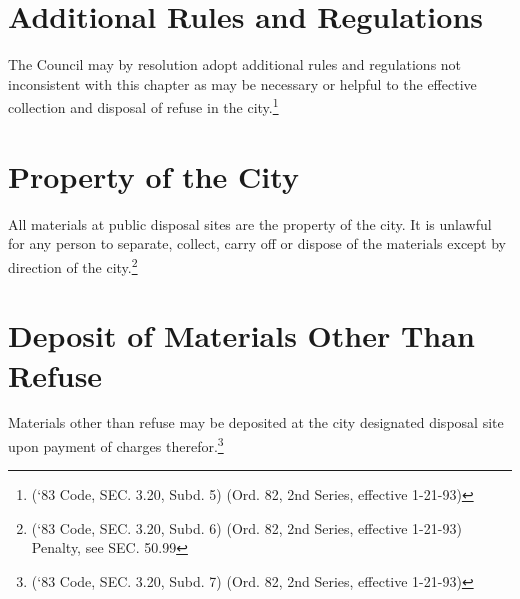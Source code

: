 \section{Additional Rules and Regulations}
The Council may by resolution adopt additional rules and regulations not inconsistent with this chapter as may be necessary or helpful to the effective collection and disposal of refuse in the city.\footnote{(‘83 Code, SEC. 3.20, Subd. 5) (Ord. 82, 2nd Series, effective 1-21-93)}
\section{Property of the City}
All materials at public disposal sites are the property of the city.  It is unlawful for any person to separate, collect, carry off or dispose of the materials except by direction of the city.\footnote{(‘83 Code, SEC. 3.20, Subd. 6) (Ord. 82, 2nd Series, effective 1-21-93) Penalty, see SEC. 50.99}
\section{Deposit of Materials Other Than Refuse}
Materials other than refuse may be deposited at the city designated disposal site upon payment of charges therefor.\footnote{(‘83 Code, SEC. 3.20, Subd. 7) (Ord. 82, 2nd Series, effective 1-21-93)}
